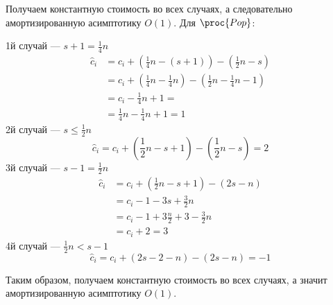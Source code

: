 \documentclass[11pt]{article}
\begin{document}
Получаем константную стоимость во всех случаях, а следовательно амортизированную асимптотику $O(1)$.
Для $\proc{Pop}$:

1й случай — $s+1 = \frac{1}{4}n$
\begin{equation}
	\begin{split}
		\hat{c}_i & = c_i + (\frac{1}{4}n-(s+1)) - (\frac{1}{2}n-s) \\
			& = c_i + (\frac{1}{4}n-\frac{1}{4}n)-(\frac{1}{2}n-\frac{1}{4}n - 1) \\
			& = c_i - \frac{1}{4}n + 1 = \\
			& = \frac{1}{4}n - \frac{1}{4}n + 1 = 1
	\end{split}
\end{equation}
2й случай — $s \leq \frac{1}{2}n$
\[
	\hat{c}_i= c_i + (\frac{1}{2}n-s+1) - (\frac{1}{2}n-s) = 2
\]
3й случай — $s - 1 = \frac{1}{2}n$
\begin{equation}
	\begin{split}
		\hat{c}_i & =  c_i + (\frac{1}{2}n-s+1) - (2s-n) \\ 
			& = c_i - 1 - 3s + \frac{3}{2}n \\
			& = c_i - 1 + 3\frac{n}{2} + 3 -\frac{3}{2}n \\
			& = c_i + 2 = 3
	\end{split}
\end{equation}
4й случай — $\frac{1}{2}n < s - 1$
\[
	\hat{c}_i= c_i + (2s-2-n) - (2s-n) = -1
\]

Таким образом, получаем константную стоимость во всех случаях, а значит амортизированную асимптотику $O(1)$.
\end{document}
